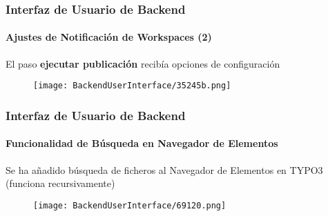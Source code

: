 \begin{frame}[fragile]
	\frametitle{Interfaz de Usuario de Backend}
	\framesubtitle{Ajustes de Notificación de Workspaces (2)}

	El paso \textbf{ejecutar publicación} recibía opciones de configuración

	\begin{figure}
		\texttt{[image: BackendUserInterface/35245b.png]}
	\end{figure}

\end{frame}

\begin{frame}[fragile]
	\frametitle{Interfaz de Usuario de Backend}
	\framesubtitle{Funcionalidad de Búsqueda en Navegador de Elementos}

	Se ha añadido búsqueda de ficheros al Navegador de Elementos en TYPO3 (funciona recursivamente)

	\begin{figure}
		\texttt{[image: BackendUserInterface/69120.png]}
	\end{figure}

\end{frame}

